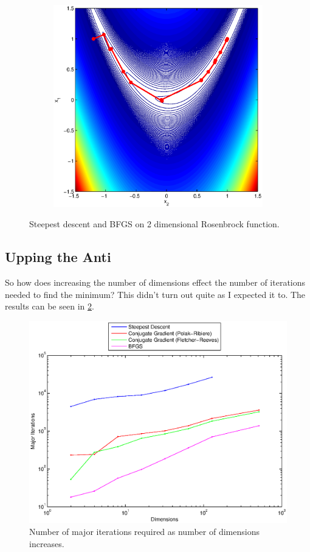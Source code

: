 \documentclass[12pt,parskip=full]{article}
\numberwithin{subsection}{section}
\begin{document}
\begin{figure}[!ht]
\begin{subfigure}[h]{0.4\textwidth}
				\includegraphics[width=\textwidth]{BfgsRose.eps}
			\end{subfigure}
			\caption{Steepest descent and BFGS on 2 dimensional Rosenbrock function.\label{fig:RoseSteepBfgs}}
		\end{figure}
		
		\subsection{Upping the Anti}
			So how does increasing the number of dimensions effect the number of iterations needed to find
			the minimum? This didn't turn out quite as I expected it to. The results can be seen in \cref{fig:IncDim}.
			
			\begin{figure}[!ht]
				\centering
				\includegraphics[scale=0.5]{DimensionEffect.eps}
				\caption{Number of major iterations required as number of dimensions increases.\label{fig:IncDim}}
			\end{figure}
			
\end{document}
